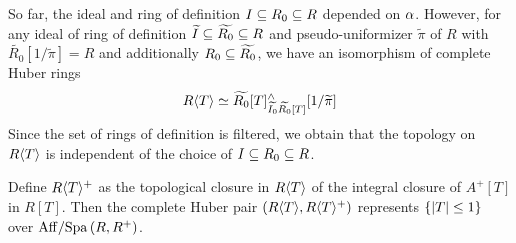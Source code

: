 \documentclass{article}
\begin{document}
\begin{lem}
\begin{proof1}
    So far, the ideal and ring of definition $I \subseteq R_0 \subseteq R$
    depended on $\alpha$.
    However, for any ideal of ring of definition 
    $\widetilde{I} \subseteq \widetilde{R_0} \subseteq R$
    and pseudo-uniformizer $\widetilde{\pi}$ of $R$
    with $\widetilde{R_0}[1 / \widetilde{\pi}] = R$
    and additionally $R_0 \subseteq \widetilde{R_0}$,
    we have an isomorphism of complete Huber rings
    \[
      R\langle T \rangle \simeq 
      \widetilde{R_0}[T]^\wedge_{\widetilde{I_0}\widetilde{R_0}[T]}[1 / \widetilde{\pi}]
    \]
    Since the set of rings of definition is filtered,
    we obtain that the topology on $R\langle T \rangle$ is independent
    of the choice of $I \subseteq R_0 \subseteq R$.
    
    Define $R\langle T \rangle^+$ as the topological closure in $R\langle T \rangle$
    of the integral closure of $A^+[T]$ in $R[T]$.
    Then the complete Huber pair $(R\langle T \rangle , R\langle T \rangle^+)$
    represents $\left\{\left\vert T \right\vert \leq 1\right\}$ over $\mathrm{Aff} / \mathrm{Spa}\,(R , R^+)$.
  \end{proof1}
\end{lem}
\end{document}
